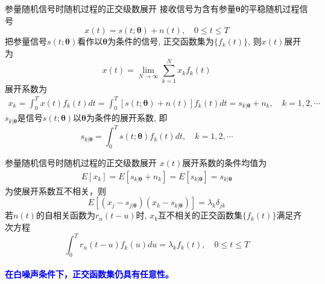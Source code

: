 \begin{frame}[shrink]{参量随机信号时随机过程的正交级数展开}
接收信号为含有参量$\bm{\theta}$的平稳随机过程信号
\[x(t)=s(t; \bm{\theta})+n(t),\quad 0\le t\le T \]
把参量信号$s(t; \bm{\theta})$看作以$\bm{\theta}$为条件的信号, 正交函数集为$\{f_k(t)\}$, 则$x(t)$展开为
\[x(t)=\lim\limits_{N\to\infty}\sum_{k=1}^{N}x_kf_k(t) \]
展开系数为
\begin{align*}
x_k=\int_{0}^{T}x(t)f_k(t)dt=\int_{0}^{T}[s(t; \bm{\theta})+n(t)]f_k(t)dt=s_{k|\bm{\theta}}+n_k,\quad k=1,2,\cdots
\end{align*}
$s_{k|\bm{\theta}}$是信号$s(t; \bm{\theta})$以$\bm{\theta}$为条件的展开系数, 即
\[s_{k|\bm{\theta}}=\int_{0}^{T}s(t; \bm{\theta})f_k(t)dt,\quad  k=1,2,\cdots \]
\end{frame}

\begin{frame}[shrink]{参量随机信号时随机过程的正交级数展开}
$x(t)$展开系数的条件均值为
\begin{align*}
E[x_k]=E[s_{k|\bm{\theta}}+n_k]=E[s_{k|\bm{\theta}}]=s_{k|\bm{\theta}}
\end{align*}
为使展开系数互不相关，则
\[E[(x_j-s_{j|\bm{\theta}})(x_k-s_{k|\bm{\theta}})]=\lambda_k\delta_{jk} \]
若$n(t)$的自相关函数为$r_n(t-u)$时, $x_k$互不相关的正交函数集$\{f_k(t)\}$满足齐次方程
\[\int_{0}^{T}r_n(t-u)f_k(u)du=\lambda_kf_k(t), \quad 0\le t\le T \]
~\\
\textbf{\textcolor{blue}{在白噪声条件下，正交函数集仍具有任意性。}}
\end{frame}
